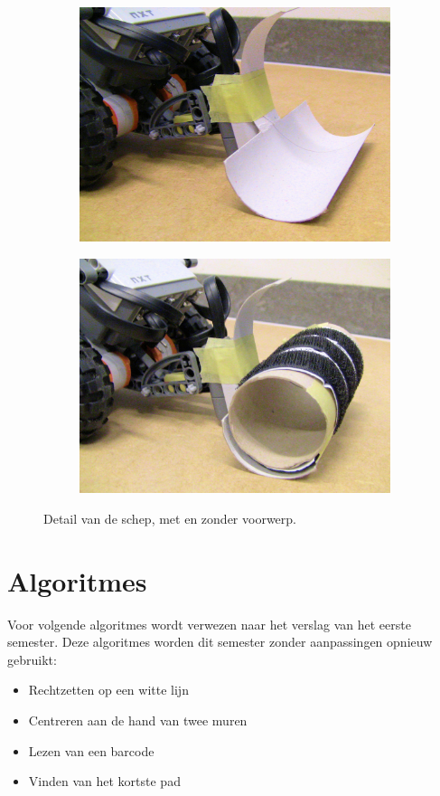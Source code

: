 \documentclass[tt2]{penoverslag}
\begin{document}
\begin{figure}
\centering
	\begin{subfigure}[h]{0.46\textwidth}
	\centering
		\includegraphics[width=\textwidth]{schepZonder}
	\end{subfigure}%
	\begin{subfigure}[h]{0.46\textwidth}
		\centering
		\includegraphics[width=\textwidth]{schepMet}
\end{subfigure}
\caption{Detail van de schep, met en zonder voorwerp.}
\label{fig:robotSchep}
\end{figure}


\section{Algoritmes}
Voor volgende algoritmes wordt verwezen naar het verslag van het eerste semester. Deze algoritmes worden dit semester zonder aanpassingen opnieuw gebruikt:
\begin{itemize}
	\item Rechtzetten op een witte lijn
	\item Centreren aan de hand van twee muren
	\item Lezen van een barcode
	\item Vinden van het kortste pad
\end{itemize}
\end{document}
